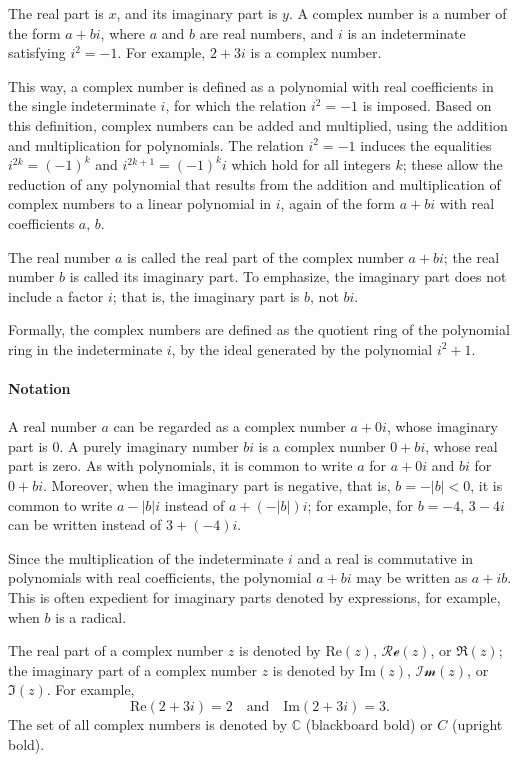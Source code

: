 The real part is $x$, and its imaginary part is $y$. A complex number is a number of the form $a + bi$, where $a$ and $b$ are real numbers, and $i$ is an indeterminate satisfying $i^2 = -1$. For example, $2 + 3i$ is a complex number.

This way, a complex number is defined as a polynomial with real coefficients in the single indeterminate $i$, for which the relation $i^2 = -1$ is imposed. Based on this definition, complex numbers can be added and multiplied, using the addition and multiplication for polynomials. The relation $i^2 = -1$ induces the equalities $i^{2k} = (-1)^k$ and $i^{2k+1} = (-1)^ki$ which hold for all integers $k$; these allow the reduction of any polynomial that results from the addition and multiplication of complex numbers to a linear polynomial in $i$, again of the form $a + bi$ with real coefficients $a$, $b$.

The real number $a$ is called the real part of the complex number $a + bi$; the real number $b$ is called its imaginary part. To emphasize, the imaginary part does not include a factor $i$; that is, the imaginary part is $b$, not $bi$.

Formally, the complex numbers are defined as the quotient ring of the polynomial ring in the indeterminate $i$, by the ideal generated by the polynomial $i^2 + 1$.

\paragraph{Notation}

A real number $a$ can be regarded as a complex number $a + 0i$, whose imaginary part is $0$. A purely imaginary number $bi$ is a complex number $0 + bi$, whose real part is zero. As with polynomials, it is common to write $a$ for $a + 0i$ and $bi$ for $0 + bi$. Moreover, when the imaginary part is negative, that is, $b = -|b| < 0$, it is common to write $a - |b|i$ instead of $a + (-|b|)i$; for example, for $b = -4$, $3 - 4i$ can be written instead of $3 + (-4)i$.

Since the multiplication of the indeterminate $i$ and a real is commutative in polynomials with real coefficients, the polynomial $a + bi$ may be written as $a + ib$. This is often expedient for imaginary parts denoted by expressions, for example, when $b$ is a radical.

The real part of a complex number $z$ is denoted by $\text{Re}(z)$, $\mathcal{Re}(z)$, or $\mathfrak{R}(z)$; the imaginary part of a complex number $z$ is denoted by $\text{Im}(z)$, $\mathcal{Im}(z)$, or $\mathfrak{I}(z)$. For example,
$$
\text{Re}(2 + 3i) = 2 \quad \text{and} \quad \text{Im}(2 + 3i) = 3.
$$
The set of all complex numbers is denoted by $\mathbb{C}$ (blackboard bold) or $C$ (upright bold).

